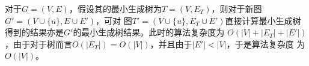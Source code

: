 \begin{solution}
    对于$G=(V,E)$，假设其的最小生成树为$T=(V,E_T)$，则对于新图$G'=(V\cup\{u\},E\cup E')$，可对
    图$T'=(V\cup\{u\},E_T\cup E')$直接计算最小生成树得到的结果亦是$G'$的最小生成树结果。此时的算法复杂度为
    $O(|V|+|E_T|+|E'|)$，由于对于树而言$O(|E_T|)=O(|V|)$，并且由于$|E'|<|V|$，于是算法复杂度
    为$O(|V|)$。
\end{solution}